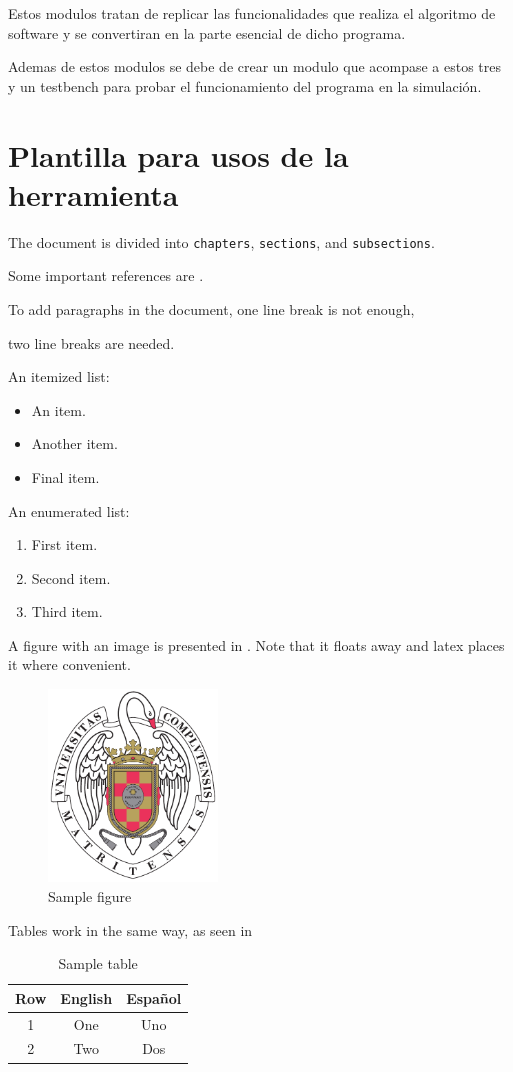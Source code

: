 	Estos modulos tratan de replicar las funcionalidades que realiza el algoritmo de software y se convertiran en la parte esencial
	de dicho programa. 
	
	Ademas de estos modulos se debe de crear un modulo que acompase a estos tres y un testbench para probar el funcionamiento
	del programa en la simulación.

\section{Plantilla para usos de la herramienta}
		The document is divided into \texttt{chapters}, \texttt{sections}, and \texttt{subsections}.

		Some important references are \cite{einstein,latexcompanion,knuthwebsite}.

		To add paragraphs in the document, 
		one line break is not enough,

		two line breaks are needed.

		An itemized list:

		\begin{itemize}
			\item An item.
			\item Another item.
			\item Final item.
		\end{itemize}

		An enumerated list:

		\begin{enumerate}
			\item First item.
			\item Second item.
			\item Third item.
		\end{enumerate}

		A figure with an image is presented in . Note that it floats away and latex places it where convenient.

		\begin{figure}[h!]
			\centering
			\includegraphics[width=0.4\textwidth]{./Images/escudo_ucm.pdf}
			\caption{Sample figure}
			\label{fig:logo_ucm}
		\end{figure}

		Tables work in the same way, as seen in 

		\begin{table}[h!]
			\centering
			\begin{tabular}{c|c|c}
				Row & English & Español \\\hline\hline
				1 & One & Uno \\
				2 & Two & Dos \\
			\end{tabular}
			\caption{Sample table}
			\label{tab:tabla}
		\end{table}
	\blindtext
